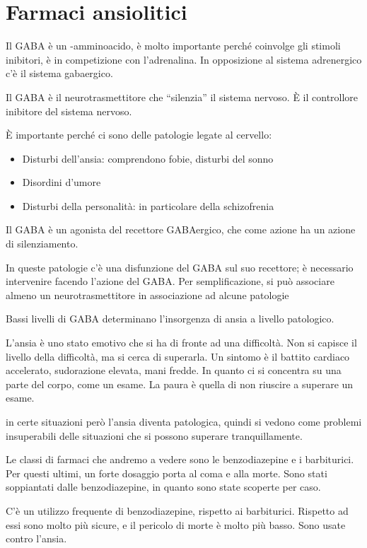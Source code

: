 \chapter{Farmaci ansiolitici}

Il GABA è un \gamma-amminoacido, è molto importante perché coinvolge gli
stimoli inibitori, è in competizione con l'adrenalina. In opposizione al
sistema adrenergico c'è il sistema gabaergico.

Il GABA è il neurotrasmettitore che ``silenzia'' il sistema nervoso. È
il controllore inibitore del sistema nervoso.

È importante perché ci sono delle patologie legate al cervello:
\begin{itemize}
  \item Disturbi dell'ansia: comprendono fobie, disturbi del sonno
  \item Disordini d'umore
  \item Disturbi della personalità: in particolare della schizofrenia
\end{itemize}
Il GABA è un agonista del recettore GABAergico, che come azione ha un
azione di silenziamento.

In queste patologie c'è una disfunzione del GABA sul suo recettore; è
necessario intervenire facendo l'azione del GABA. Per semplificazione,
si può associare almeno un neurotrasmettitore in associazione ad alcune
patologie

Bassi livelli di GABA determinano l'insorgenza di ansia a livello
patologico.


L'ansia è uno stato emotivo che si ha di fronte ad una difficoltà. Non
si capisce il livello della difficoltà, ma si cerca di superarla. Un
sintomo è il battito cardiaco accelerato, sudorazione elevata, mani
fredde. In quanto ci si concentra su una parte del corpo, come un esame.
La paura è quella di non riuscire a superare un esame.

in certe situazioni però l'ansia diventa patologica, quindi si vedono
come problemi insuperabili delle situazioni che si possono superare
tranquillamente.

Le classi di farmaci che andremo a vedere sono le benzodiazepine e i barbiturici.
Per questi ultimi, un forte dosaggio porta al coma e alla morte. Sono stati soppiantati
dalle benzodiazepine, in quanto sono state scoperte per caso.

C'è un utilizzo frequente di benzodiazepine, rispetto ai barbiturici.
Rispetto ad essi sono molto più sicure, e il pericolo di morte è molto
più basso. Sono usate contro l'ansia.

